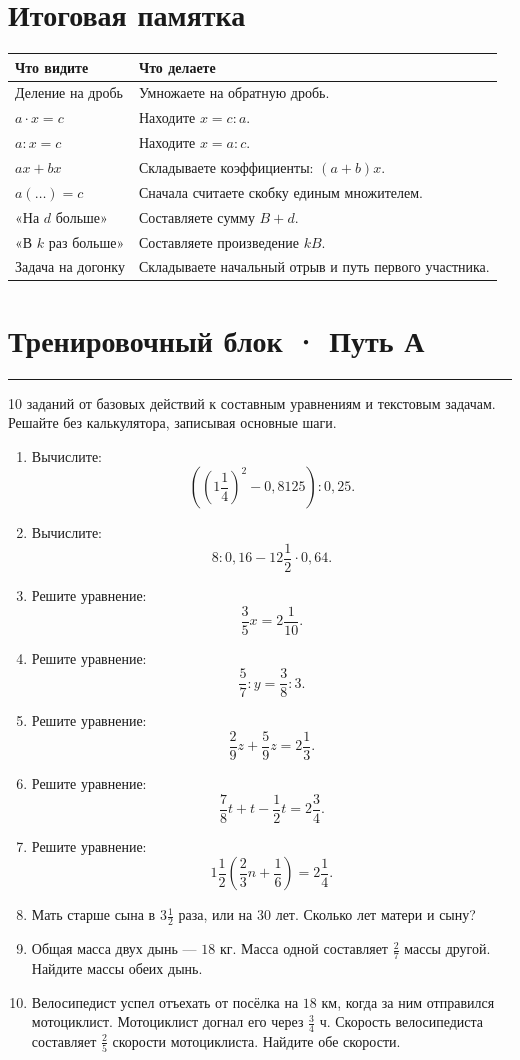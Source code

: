 \documentclass[a4paper,12pt]{article}
\newcommand{\sect}[1]{\section*{#1}\vspace{-3pt}\noindent\textcolor{accent}{\rule{\linewidth}{0.5pt}}\vspace{3pt}}
\begin{document}
\section*{Итоговая памятка}
\begin{center}
\begin{tabularx}{\linewidth}{@{}p{.34\linewidth}X@{}}
\toprule
\textbf{Что видите} & \textbf{Что делаете} \\
\midrule
Деление на дробь & Умножаете на обратную дробь. \\
$a\cdot x=c$ & Находите $x=c:a$. \\
$a:x=c$ & Находите $x=a:c$. \\
$ax+bx$ & Складываете коэффициенты: $(a+b)x$. \\
$a(\ldots)=c$ & Сначала считаете скобку единым множителем. \\
«На $d$ больше» & Составляете сумму $B+d$. \\
«В $k$ раз больше» & Составляете произведение $kB$. \\
Задача на догонку & Складываете начальный отрыв и путь первого участника. \\
\bottomrule
\end{tabularx}
\end{center}
\clearpage

\sect{Тренировочный блок · Путь А}
\textcolor{muted}{10 заданий от базовых действий к составным уравнениям и текстовым задачам. Решайте без калькулятора, записывая основные шаги.}
\begin{enumerate}[label=\textbf{\arabic*.}]
\item Вычислите:
\[
\left(\left(1\frac14\right)^2-0{,}8125\right):0{,}25.
\]
\item Вычислите:
\[
8:0{,}16-12\frac12\cdot0{,}64.
\]
\item Решите уравнение:
\[\frac35x=2\frac1{10}.\]
\item Решите уравнение:
\[\frac57:y=\frac38:3.\]
\item Решите уравнение:
\[\frac29z+\frac59z=2\frac13.\]
\item Решите уравнение:
\[\frac78t+t-\frac12t=2\frac34.\]
\item Решите уравнение:
\[1\frac12\left(\frac23n+\frac16\right)=2\frac14.\]
\item Мать старше сына в $3\frac12$ раза, или на $30$ лет. Сколько лет матери и сыну?
\item Общая масса двух дынь --- $18$ кг. Масса одной составляет $\frac27$ массы другой. Найдите массы обеих дынь.
\item Велосипедист успел отъехать от посёлка на $18$ км, когда за ним отправился мотоциклист. Мотоциклист догнал его через $\frac34$ ч. Скорость велосипедиста составляет $\frac25$ скорости мотоциклиста. Найдите обе скорости.
\end{enumerate}
\clearpage
\end{document}

